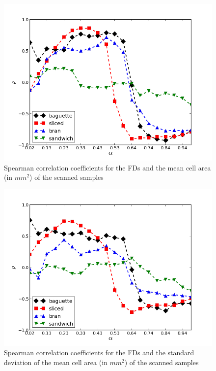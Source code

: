 \begin{figure}[htb]
\centering
\includegraphics[scale=0.4]{../images/Fig8}
\caption{Spearman correlation coefficients for the FDs and the mean cell area (in $mm^{2}$) of the scanned samples}
\label{fig:corrMCA}
\end{figure}

\begin{figure}[htb]
\centering
\includegraphics[scale=0.4]{../images/Fig9}
\caption{Spearman correlation coefficients for the FDs and the standard deviation of the mean cell area (in $mm^{2}$) of the scanned samples}
\label{fig:corrMCAstdev}
\end{figure}

